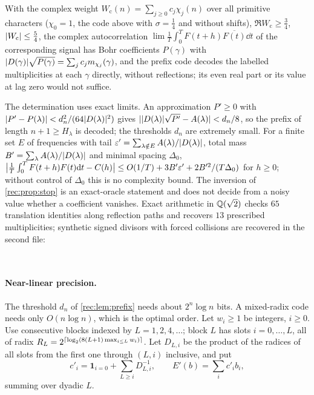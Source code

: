 With the complex weight $W_{\mathrm c}(n)=\sum_{j\ge0}c_j\chi_j(n)$ over all primitive characters ($\chi_0=1$, the
code above with $\sigma=\tfrac14$ and without shifts), $\Re W_{\mathrm c}\ge\tfrac34$, $\lvert W_{\mathrm c}\rvert\le\tfrac54$, the complex
autocorrelation $\lim\frac1T\int_0^TF(t+h)\overline{F(t)}\dd t$ of the corresponding signal has Bohr coefficients
$P(\gamma)$ with $\lvert D(\gamma)\rvert\sqrt{P(\gamma)}=\sum_jc_jm_{\chi_j}(\gamma)$, and the prefix code decodes the labelled
multiplicities at each $\gamma$ directly, without reflections; its even real part or its value at lag zero
would not suffice.

The determination uses exact limits. An approximation $P'\ge0$ with
$\lvert P'-P(\lambda)\rvert<d_n^2/(64\lvert D(\lambda)\rvert^2)$ gives $\lvert\lvert D(\lambda)\rvert\sqrt{P'}-A(\lambda)\rvert<d_n/8$, so the prefix of length
$n+1\ge H_\lambda$ is decoded; the thresholds $d_n$ are extremely small. For a finite set $E$ of frequencies
with tail $\varepsilon'=\sum_{\lambda\notin E}A(\lambda)/\lvert D(\lambda)\rvert$, total mass $B'=\sum_\lambda A(\lambda)/\lvert D(\lambda)\rvert$ and minimal spacing
$\Delta_0$, $\bigl\lvert\frac1T\int_0^TF(t+h)F(t)\mathrm{d} t-C(h)\bigr\rvert\le O(1/T)+3B'\varepsilon'+2B'^2/(T\Delta_0)$ for $h\ge0$;
without control of $\Delta_0$ this is no complexity bound. The inversion of \cref{rec:prop:stop} is an
exact-oracle statement and does not decide from a noisy value whether a coefficient vanishes. Exact
arithmetic in $\mathbb{Q}(\sqrt2)$ checks $65$ translation identities along reflection paths and recovers $13$
prescribed multiplicities; synthetic signed divisors with forced collisions are recovered in the
second file:
\begin{center}
\\
\end{center}

\paragraph{Near-linear precision.}
The threshold $d_n$ of \cref{rec:lem:prefix} needs about $2^n\log n$ bits. A mixed-radix code needs only
$O(n\log n)$, which is the optimal order. Let $w_i\ge1$ be integers, $i\ge0$. Use consecutive blocks indexed by
$L=1,2,4,\dots$; block $L$ has slots $i=0,\dots,L$, all of radix
$R_L=2^{\lceil\log_2(8(L+1)\max_{i\le L}w_i)\rceil}$. Let $D_{L,i}$ be the product of the radices of all slots from
the first one through $(L,i)$ inclusive, and put
\begin{equation}\label{rec:eq:radix}
 c'_i=\mathbf 1_{i=0}+\sum_{L\ge i}D_{L,i}^{-1},\qquad E'(b)=\sum_ic'_ib_i,
\end{equation}
summing over dyadic $L$.

